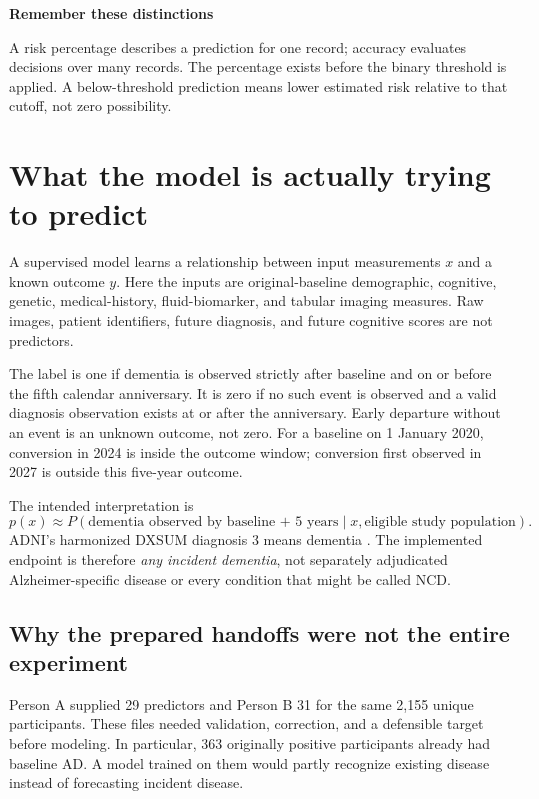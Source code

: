 \tableofcontents
\vfill
\textbf{Remember these distinctions}\par
A risk percentage describes a prediction for one record; accuracy evaluates decisions over many records. The percentage exists before the binary threshold is applied. A below-threshold prediction means lower estimated risk relative to that cutoff, not zero possibility.
\clearpage

\section{What the model is actually trying to predict}
A supervised model learns a relationship between input measurements $x$ and a known outcome $y$. Here the inputs are original-baseline demographic, cognitive, genetic, medical-history, fluid-biomarker, and tabular imaging measures. Raw images, patient identifiers, future diagnosis, and future cognitive scores are not predictors.

The label is one if dementia is observed strictly after baseline and on or before the fifth calendar anniversary. It is zero if no such event is observed and a valid diagnosis observation exists at or after the anniversary. Early departure without an event is an unknown outcome, not zero. For a baseline on 1 January 2020, conversion in 2024 is inside the outcome window; conversion first observed in 2027 is outside this five-year outcome.

The intended interpretation is
\begin{equation}
p(x)\approx P(\text{dementia observed by baseline + 5 years}\mid x,\text{eligible study population}).
\end{equation}
ADNI's harmonized DXSUM diagnosis 3 means dementia \cite{adni}. The implemented endpoint is therefore \emph{any incident dementia}, not separately adjudicated Alzheimer-specific disease or every condition that might be called NCD.

\subsection{Why the prepared handoffs were not the entire experiment}
Person A supplied 29 predictors and Person B 31 for the same 2,155 unique participants. These files needed validation, correction, and a defensible target before modeling. In particular, 363 originally positive participants already had baseline AD. A model trained on them would partly recognize existing disease instead of forecasting incident disease.

